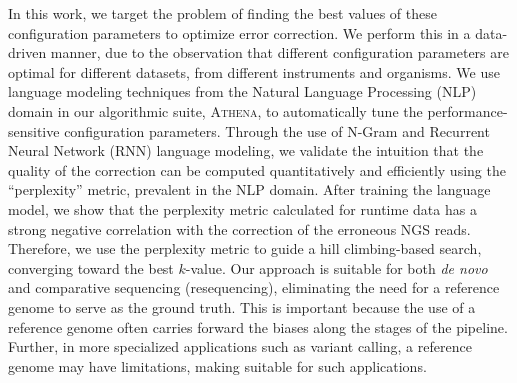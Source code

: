  In this work, we target the problem of finding the best values of these configuration parameters to optimize error correction.
We perform this in a data-driven manner, due to the observation that different configuration parameters are optimal for different datasets, \ie from different instruments and organisms. 
We use language modeling techniques from the Natural Language Processing (NLP) domain in our algorithmic suite, \textsc{Athena}, to automatically tune the performance-sensitive configuration parameters. Through the use of N-Gram and Recurrent Neural Network (RNN) language modeling, we validate the intuition that the quality of the correction can be computed quantitatively and efficiently using the ``perplexity'' metric, prevalent in the NLP domain. After training the language model, we show that the perplexity metric calculated for runtime data has a strong negative correlation with the correction of the erroneous NGS reads. Therefore, we use the perplexity metric to guide a hill climbing-based search, converging toward the best $k$-value. Our approach is suitable for both \textit{de novo} and comparative sequencing (resequencing), eliminating the need for a reference genome to serve as the ground truth. This is important because the use of a reference genome often carries forward the biases along the stages of the pipeline. Further, in more specialized applications such as variant calling, a reference genome may have limitations, making \name suitable for such applications. %
